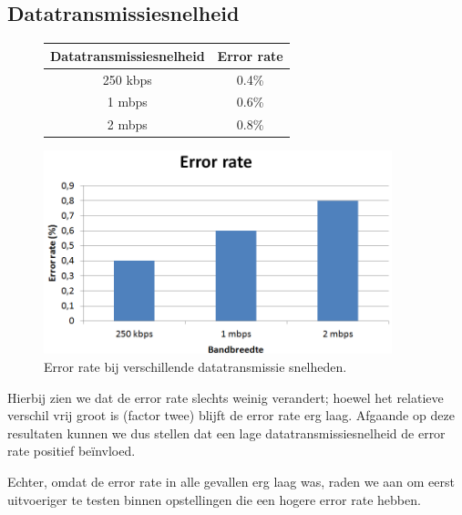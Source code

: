 \documentclass[a4paper,10pt]{article}
\begin{document}
\subsection{Datatransmissiesnelheid}
\begin{figure}[h!]
    \begin{minipage}{\textwidth}
        \begin{minipage}{0.49\textwidth}
            \centering
            \begin{tabular}{cc} \hline
                Datatransmissiesnelheid &  Error rate   \\ \hline
                250 kbps                &  0.4\%        \\
                1 mbps                  &  0.6\%        \\
                2 mbps                  &  0.8\%        \\ \hline
            \end{tabular}
        \end{minipage}
        \hfill
        \begin{minipage}{0.49\textwidth}
            \centering
            \includegraphics[width=0.9\textwidth]{bandbreedte.png}
        \end{minipage}
        \caption{Error rate bij verschillende datatransmissie snelheden.}
    \end{minipage}
\end{figure}
Hierbij zien we dat de error rate slechts weinig verandert; hoewel het relatieve verschil vrij groot is (factor twee) blijft de error rate erg laag. Afgaande op deze resultaten kunnen we dus stellen dat een lage datatransmissiesnelheid de error rate positief be\"invloed.

Echter, omdat de error rate in alle gevallen erg laag was, raden we aan om eerst uitvoeriger te testen binnen opstellingen die een hogere error rate hebben.
\end{document}
